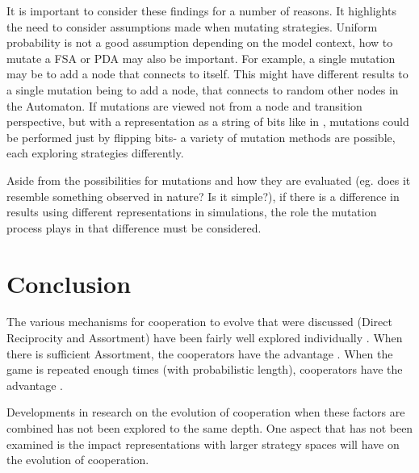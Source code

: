\documentclass[a4paper,11pt,bcshonoursthesis,singlespace,twoside]{cssethesis}
\renewcommand{\cite}{\citep} %
\begin{document}
It is important to consider these findings for a number of reasons. 
It highlights the need to consider assumptions made when mutating strategies. 
Uniform probability is not a good assumption depending on the model context, how to mutate a FSA or PDA may also be important. For example, a single mutation may be to add a node that connects to itself. 
This might have different results to a single mutation being to add a node, that connects to random other nodes in the Automaton. If mutations are viewed not from a node and transition perspective, but with a representation as a string of bits like in \cite{miller1996coevolution}, mutations could be performed just by flipping bits- a variety of mutation methods are possible, each exploring strategies differently.

Aside from the possibilities for mutations and how they are evaluated (eg. does it resemble something observed in nature? Is it simple?), if there is a difference in results using different representations in simulations, the role the mutation process plays in that difference must be considered. 

\section{Conclusion}
\label{sec:conc}
The various mechanisms for cooperation to evolve that were discussed (Direct Reciprocity and Assortment) have been fairly well explored individually \citep{imhof:PNAS:2005, nowak:Science:2006}. 
When there is sufficient Assortment, the cooperators have the advantage \citep{bergstrom2003algebra}. 
When the game is repeated enough times (with probabilistic length), cooperators have the advantage \citep{Axelrod1984}. 

Developments in research on the evolution of cooperation when these factors are combined has not been explored to the same depth. One aspect that has not been examined is the impact representations with larger strategy spaces will have on the evolution of cooperation.
\end{document}
